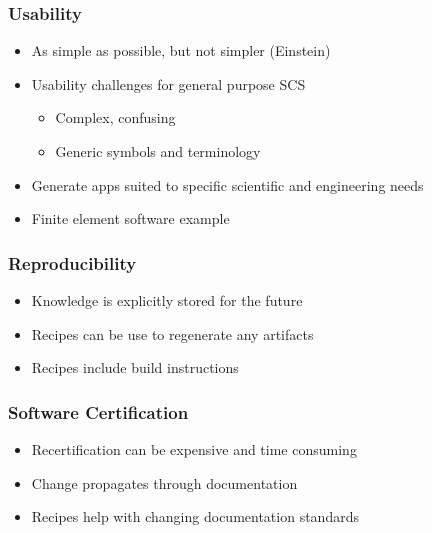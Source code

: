 \documentclass{beamer}
\begin{document}

\begin{frame}

\frametitle{Usability}

\begin{itemize}
\item As simple as possible, but not simpler (Einstein)
\item Usability challenges for general purpose SCS
\begin{itemize}
\item Complex, confusing
\item Generic symbols and terminology
\end{itemize}
\item Generate apps suited to specific scientific and engineering needs
\item Finite element software example
\end{itemize}
\end{frame}


\begin{frame}

\frametitle{Reproducibility}

\begin{itemize}
\item Knowledge is explicitly stored for the future
\item Recipes can be use to regenerate any artifacts
\item Recipes include build instructions
\end{itemize}
\end{frame}


\begin{frame}

\frametitle{Software Certification}

\begin{itemize}
\item Recertification can be expensive and time consuming
\item Change propagates through documentation
\item Recipes help with changing documentation standards
\end{itemize}

\end{frame}

\end{document}
